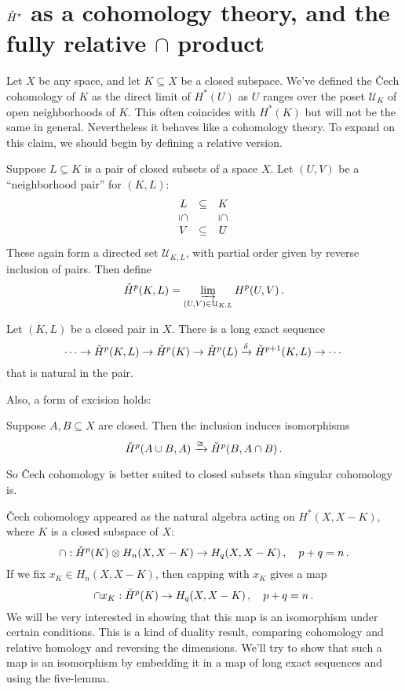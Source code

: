 \section{$\check{H}^\ast$ as a cohomology theory, and the fully relative $\cap$ product}

Let $X$ be any space, and let $K\subseteq X$ be a closed subspace.
We've defined the \v{C}ech cohomology of $K$ as the direct limit of 
$H^*(U)$ as $U$ ranges over the poset $\mathcal{U}_K$ of open neighborhoods
of $K$. This often coincides with $H^*(K)$ but will not be the same in
general. Nevertheless it behaves like a cohomology theory. To expand on
this claim, we should begin by defining a relative version. 

Suppose $L\subseteq K$ is a pair of  closed subsets of a space $X$.  Let 
$(U,V)$ be a ``neighborhood pair'' for $(K,L)$: 
\[
\begin{array}{ccc} L & \subseteq & K \\
\downsubseteq & & \downsubseteq \\
V & \subseteq & U
\end{array}
\]
These again form a directed set $\mathcal{U}_{K,L}$,
with partial order given by reverse inclusion of pairs. Then define
\[
\check{H}^p(K,L)=\varinjlim_{(U,V)\in\mathcal{U}_{K,L}} H^p(U,V)\,.
\]
\begin{theorem}
Let $(K,L)$ be a closed pair in $X$. There is a long exact sequence
\begin{equation*}
\cdots\to\check{H}^p(K,L)\to\check{H}^p(K)\to\check{H}^p(L)\xrightarrow{\delta}\check{H}^{p+1}(K,L)\to\cdots
\end{equation*}
that is natural in the pair. 
\end{theorem}

Also, a form of excision holds:
\begin{theorem}[Excision]
Suppose $A,B\subseteq X$ are closed. Then the inclusion induces isomorphisms
\[
\check{H}^p(A\cup B,A)\xrightarrow{\cong}\check{H}^p(B,A\cap B)\,.
\] 
\end{theorem}
So \v{C}ech cohomology is better suited to closed subsets than singular
cohomology is. 

\v{C}ech cohomology appeared as the natural algebra acting on $H^*(X,X-K)$,
where $K$ is a closed subspace of $X$: 
\[
\cap:\check{H}^p(K)\otimes H_n(X,X-K)\to H_q(X,X-K)\,,\quad p+q=n\,.
\]
If we fix $x_K\in H_n(X,X-K)$, then capping with $x_K$ gives a map 
\[
\cap x_K:\check{H}^p(K)\to H_q(X,X-K)\,,\quad p+q=n\,. 
\]
We will be very interested in showing that this map is an isomorphism 
under certain conditions. This is a kind of duality result, comparing
cohomology and relative homology and reversing the dimensions. 
We'll try to show that such a map is an isomorphism by embedding it 
in a map of long exact sequences and using the five-lemma. 

